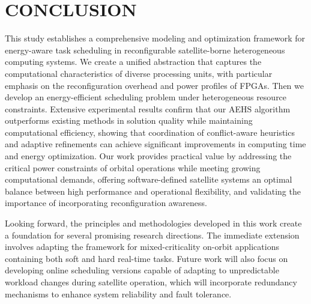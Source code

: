 \documentclass{IEEEtaes}
\begin{document}
\section{CONCLUSION}
\label{sec:conclusion}
This study establishes a comprehensive modeling and optimization framework for energy-aware task scheduling in reconfigurable satellite-borne heterogeneous computing systems. We create a unified abstraction that captures the computational characteristics of diverse processing units, with particular emphasis on the reconfiguration overhead and power profiles of FPGAs. Then we develop an energy-efficient scheduling problem under heterogeneous resource constraints. Extensive experimental results confirm that our AEHS algorithm outperforms existing methods in solution quality while maintaining computational efficiency, showing that coordination of conflict-aware heuristics and adaptive refinements can achieve significant improvements in computing time and energy optimization. Our work provides practical value by addressing the critical power constraints of orbital operations while meeting growing computational demands, offering software-defined satellite systems an optimal balance between high performance and operational flexibility, and validating the importance of incorporating reconfiguration awareness.

Looking forward, the principles and methodologies developed in this work create a foundation for several promising research directions. The immediate extension involves adapting the framework for mixed-criticality on-orbit applications containing both soft and hard real-time tasks. Future work will also focus on developing online scheduling versions capable of adapting to unpredictable workload changes during satellite operation, which will incorporate redundancy mechanisms to enhance system reliability and fault tolerance.



\end{document}
